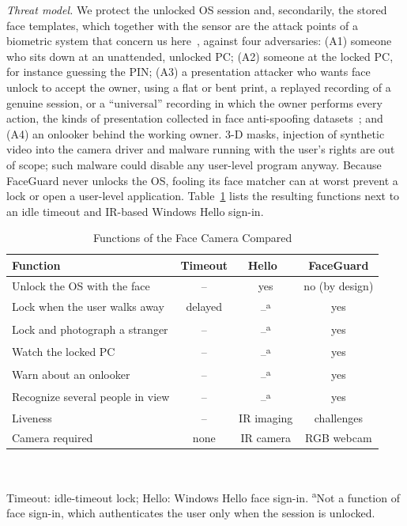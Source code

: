 \documentclass[journal]{IEEEtran}
\newcommand{\sys}{FaceGuard}
\begin{document}
\emph{Threat model.} We protect the unlocked OS session and, secondarily, the stored face templates, which together with the sensor are the attack points of a biometric system that concern us here~\cite{ratha2001enhancing}, against four adversaries: (A1) someone who sits down at an unattended, unlocked PC; (A2) someone at the locked PC, for instance guessing the PIN; (A3) a presentation attacker who wants face unlock to accept the owner, using a flat or bent print, a replayed recording of a genuine session, or a ``universal'' recording in which the owner performs every action, the kinds of presentation collected in face anti-spoofing datasets~\cite{zhang2012casiafasd}; and (A4) an onlooker behind the working owner. 3-D masks, injection of synthetic video into the camera driver and malware running with the user's rights are out of scope; such malware could disable any user-level program anyway. Because \sys{} never unlocks the OS, fooling its face matcher can at worst prevent a lock or open a user-level application. Table~\ref{tab:compare} lists the resulting functions next to an idle timeout and IR-based Windows Hello sign-in.

\begin{table}[!t]
\centering
\caption{Functions of the Face Camera Compared}
\label{tab:compare}
\footnotesize
\setlength{\tabcolsep}{3pt}
\begin{tabular}{@{}lccc@{}}
\toprule
Function & Timeout & Hello~\cite{ms2024hello} & \sys{} \\
\midrule
Unlock the OS with the face & -- & yes & no (by design) \\
Lock when the user walks away & delayed & --\textsuperscript{a} & yes \\
Lock and photograph a stranger & -- & --\textsuperscript{a} & yes \\
Watch the locked PC & -- & --\textsuperscript{a} & yes \\
Warn about an onlooker & -- & --\textsuperscript{a} & yes \\
Recognize several people in view & -- & --\textsuperscript{a} & yes \\
Liveness & -- & IR imaging & challenges \\
Camera required & none & IR camera & RGB webcam \\
\bottomrule
\end{tabular}\\[2pt]
\raggedright\scriptsize Timeout: idle-timeout lock; Hello: Windows Hello face sign-in. \textsuperscript{a}Not a function of face sign-in, which authenticates the user only when the session is unlocked.
\end{table}
\end{document}
